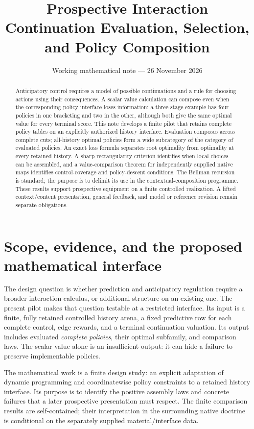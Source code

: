 \documentclass[11pt]{article}
\title{Prospective Interaction\\
\large Continuation Evaluation, Selection, and Policy Composition}
\author{}
\date{Working mathematical note --- 26 November 2026}
\theoremstyle{definition}
\begin{document}
\maketitle
\vspace{-1.5em}
\begin{abstract}
Anticipatory control requires a model of possible continuations and a rule
for choosing actions using their consequences. A scalar value calculation
can compose even when the corresponding policy interface loses information:
a three-stage example has four policies in one bracketing and two in the
other, although both give the same optimal value for every terminal score.
This note develops a finite pilot that retains complete policy tables on an
explicitly authorized history interface. Evaluation composes across complete
cuts; all-history optimal policies form a wide subcategory of the category
of evaluated policies. An exact loss formula separates root optimality from
optimality at every retained history. A sharp rectangularity criterion
identifies when local choices can be assembled, and a value-comparison
theorem for independently supplied native maps identifies control-coverage and policy-descent
conditions. The Bellman recursion is standard; the purpose is to delimit its
use in the contextual-composition programme. These results support prospective
equipment on a finite controlled realization. A lifted context/content
presentation, general feedback, and model or reference revision remain
separate obligations.
\end{abstract}

\section{Scope, evidence, and the proposed mathematical interface}
\label{sec:scope}
The design question is whether prediction and anticipatory regulation require
a broader interaction calculus, or additional structure on an existing one.
The present pilot makes that question testable at a restricted interface.
Its input is a finite, fully retained controlled history arena, a fixed
predictive row for each complete control, edge rewards, and a terminal
continuation valuation. Its output includes evaluated \emph{complete policies},
their optimal subfamily, and comparison laws. The scalar value alone is an
insufficient output: it can hide a failure to preserve implementable policies.

The mathematical work is a finite design study: an explicit adaptation of
dynamic programming and coordinatewise policy constraints to a retained
history interface. Its purpose is to identify the positive assembly laws
and concrete failures that a later prospective presentation must respect.
The finite comparison results are self-contained; their interpretation in
the surrounding native doctrine is conditional on the separately supplied
material/interface data.
\end{document}
